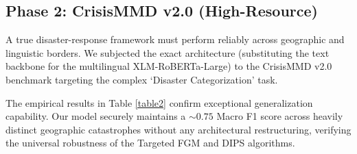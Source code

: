 \documentclass[twoside,twocolumn,10pt]{article}
\begin{document}
\begin{table}[h]
\centering
\caption{Ablation Study on BanglaCalamityMMD (Phase 1)}
\label{table1}
\renewcommand{\arraystretch}{1.2}
\setlength{\tabcolsep}{6pt}
\end{table}

\subsection{Phase 2: CrisisMMD v2.0 (High-Resource)}
A true disaster-response framework must perform reliably across geographic and linguistic borders. We subjected the exact architecture (substituting the text backbone for the multilingual XLM-RoBERTa-Large) to the CrisisMMD v2.0 benchmark targeting the complex `Disaster Categorization' task. 

\begin{table}[h]
\centering
\caption{Generalization Benchmark on CrisisMMD (Phase 2)}
\label{table2}
\renewcommand{\arraystretch}{1.2}
\setlength{\tabcolsep}{6pt}
\end{table}

The empirical results in Table \ref{table2} confirm exceptional generalization capability. Our model securely maintains a $\sim0.75$ Macro F1 score across heavily distinct geographic catastrophes without any architectural restructuring, verifying the universal robustness of the Targeted FGM and DIPS algorithms.
\end{document}
